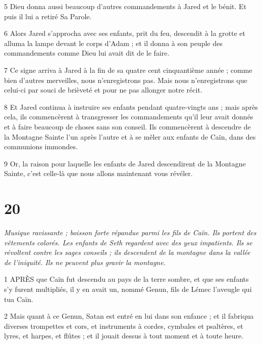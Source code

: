 \par 5 Dieu donna aussi beaucoup d'autres commandements à Jared et le bénit. Et puis il lui a retiré Sa Parole.

\par 6 Alors Jared s'approcha avec ses enfants, prit du feu, descendit à la grotte et alluma la lampe devant le corps d'Adam ; et il donna à son peuple des commandements comme Dieu lui avait dit de le faire.

\par 7 Ce signe arriva à Jared à la fin de sa quatre cent cinquantième année ; comme bien d’autres merveilles, nous n’enregistrons pas. Mais nous n’enregistrons que celui-ci par souci de brièveté et pour ne pas allonger notre récit.

\par 8 Et Jared continua à instruire ses enfants pendant quatre-vingts ans ; mais après cela, ils commencèrent à transgresser les commandements qu'il leur avait donnés et à faire beaucoup de choses sans son conseil. Ils commencèrent à descendre de la Montagne Sainte l'un après l'autre et à se mêler aux enfants de Caïn, dans des communions immondes.

\par 9 Or, la raison pour laquelle les enfants de Jared descendirent de la Montagne Sainte, c'est celle-là que nous allons maintenant vous révéler.



\chapter{20}

\par \textit{Musique ravissante ; boisson forte répandue parmi les fils de Caïn. Ils portent des vêtements colorés. Les enfants de Seth regardent avec des yeux impatients. Ils se révoltent contre les sages conseils ; ils descendent de la montagne dans la vallée de l'iniquité. Ils ne peuvent plus gravir la montagne.}

\par 1 APRÈS que Caïn fut descendu au pays de la terre sombre, et que ses enfants s'y furent multipliés, il y en avait un, nommé Genun, fils de Lémec l'aveugle qui tua Caïn.

\par 2 Mais quant à ce Genun, Satan est entré en lui dans son enfance ; et il fabriqua diverses trompettes et cors, et instruments à cordes, cymbales et psaltères, et lyres, et harpes, et flûtes ; et il jouait dessus à tout moment et à toute heure.

